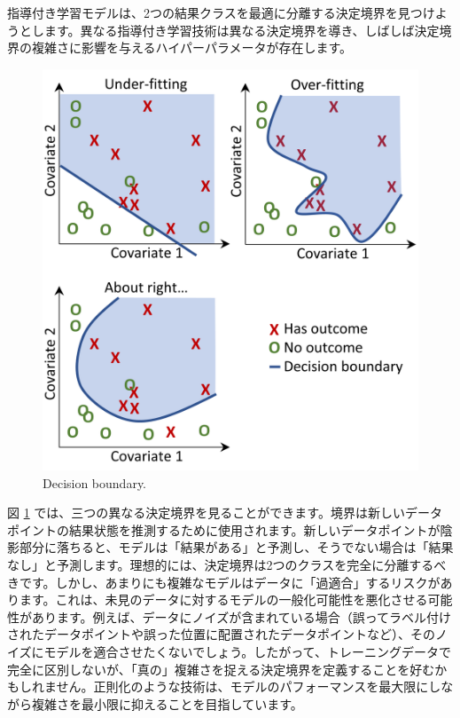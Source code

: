 \documentclass[
  11pt]{book}
\theoremstyle{definition}
\theoremstyle{definition}
\theoremstyle{definition}
\theoremstyle{definition}
\theoremstyle{remark}
\begin{document}
指導付き学習モデルは、2つの結果クラスを最適に分離する決定境界を見つけようとします。異なる指導付き学習技術は異なる決定境界を導き、しばしば決定境界の複雑さに影響を与えるハイパーパラメータが存在します。 

\begin{figure}

{\centering \includegraphics[width=0.8\linewidth]{images/PatientLevelPrediction/decisionBoundary} 

}

\caption{Decision boundary.}\label{fig:decisionBoundary}
\end{figure}

図 \ref{fig:decisionBoundary} では、三つの異なる決定境界を見ることができます。境界は新しいデータポイントの結果状態を推測するために使用されます。新しいデータポイントが陰影部分に落ちると、モデルは「結果がある」と予測し、そうでない場合は「結果なし」と予測します。理想的には、決定境界は2つのクラスを完全に分離するべきです。しかし、あまりにも複雑なモデルはデータに「過適合」するリスクがあります。これは、未見のデータに対するモデルの一般化可能性を悪化させる可能性があります。例えば、データにノイズが含まれている場合（誤ってラベル付けされたデータポイントや誤った位置に配置されたデータポイントなど）、そのノイズにモデルを適合させたくないでしょう。したがって、トレーニングデータで完全に区別しないが、「真の」複雑さを捉える決定境界を定義することを好むかもしれません。正則化のような技術は、モデルのパフォーマンスを最大限にしながら複雑さを最小限に抑えることを目指しています。
\end{document}
